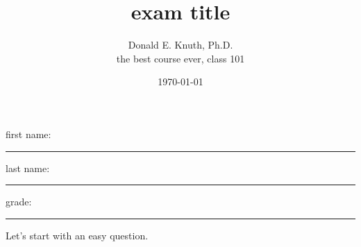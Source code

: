 \newtoggle{withbonus} \togglefalse{withbonus} %

\newcommand{\mycourse}{the best course ever}
\newcommand{\myclass}{class 101}
\newcommand{\mydate}{\today}

\title{\textbf{exam title}}
\author{Donald E. Knuth, Ph.D.\\
	\mycourse, \myclass}
\date{\mydate}
\maketitle
\thispagestyle{headandfoot}

\begin{center}
\end{center}
\vspace{10mm}

\begin{center}
	first name: \rule{45mm}{0.8pt}\qquad last name: \rule{45mm}{0.8pt}
\end{center}
\vspace{20mm}

\begin{center}
	\iftoggle{withbonus} {
		\combinedgradetable[h][questions]
	} {
		\gradetable[h][questions]
	}
\end{center}
\vspace{15mm}
\begin{center}
	grade:
	\vspace{10mm}

	\rule{8mm}{1.2pt}
\end{center}
\clearpage

\begin{questions}
	\question[3] Let's start with an easy question.
\end{questions}

